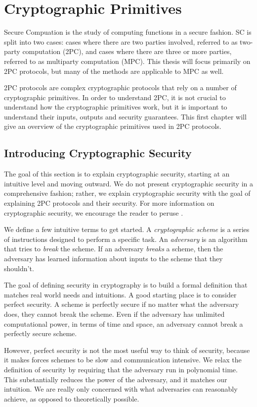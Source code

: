 \chapter{Cryptographic Primitives}
Secure Compuation is the study of computing functions in a secure fashion. 
SC is split into two cases: cases where there are two parties involved, referred to as two-party computation (2PC), and cases where there are three or more parties, referred to as multiparty computation (MPC).
This thesis will focus primarily on 2PC protocols, but many of the methods are applicable to MPC as well.

2PC protocols are complex cryptographic protocols that rely on a number of cryptographic primitives.
In order to understand 2PC, it is not crucial to understand how the cryptographic primitives work, but it is important to understand their inputs, outputs and security guarantees. 
This first chapter will give an overview of the cryptographic primitives used in 2PC protocols.

\section{Introducing Cryptographic Security} 
The goal of this section is to explain cryptographic security, starting at an intuitive level and moving outward. 
We do not present cryptographic security in a comprehensive fashion; rather, we explain cryptographic security with the goal of explaining 2PC protocols and their security.
For more information on cryptographic security, we encourage the reader to peruse \cite{katzlindelltextbook}. 

We define a few intuitive terms to get started.
A \textit{cryptographic scheme} is a series of instructions designed to perform a specific task. 
An \textit{adversary} is an algorithm that tries to \textit{break} the scheme. 
If an adversary \textit{breaks} a scheme, then the adversary has learned information about inputs to the scheme that they shouldn't. 

The goal of defining security in cryptography is to build a formal definition that matches real world needs and intuitions. 
A good starting place is to consider perfect security. 
A scheme is perfectly secure if no matter what the adversary does, they cannot break the scheme.
Even if the adversary has unlimited computational power, in terms of time and space, an adversary cannot break a perfectly secure scheme. 

However, perfect security is not the most useful way to think of security, because it makes forces schemes to be slow and communication intensive.
We relax the definition of security by requiring that the adversary run in polynomial time. 
This substantially reduces the power of the adversary, and it matches our intuition. 
We are really only concerned with what adversaries can reasonably achieve, as opposed to theoretically possible. 

